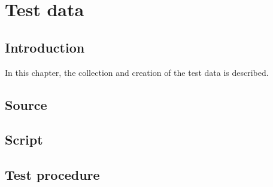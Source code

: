 
\chapter{Test data} %

\label{Chapter4} %



\section{Introduction}

In this chapter, the collection and creation of the test data is described.

\section{Source}
\section{Script}
\section{Test procedure}

